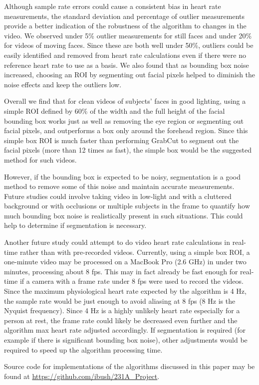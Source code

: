 \documentclass[10pt,twocolumn,letterpaper]{article}
\begin{document}
Although sample rate errors could cause a consistent bias in heart rate measurements, the standard deviation and percentage of outlier measurements provide a better indication of the robustness of the algorithm to changes in the video. We observed under 5\% outlier measurements for still faces and under 20\% for videos of moving faces. Since these are both well under 50\%, outliers could be easily identified and removed from heart rate calculations even if there were no reference heart rate to use as a basis. We also found that as bounding box noise increased, choosing an ROI by segmenting out facial pixels helped to diminish the noise effects and keep the outliers low.

Overall we find that for clean videos of subjects' faces in good lighting, using a simple ROI defined by 60\% of the width and the full height of the facial bounding box works just as well as removing the eye region or segmenting out facial pixels, and outperforms a box only around the forehead region. Since this simple box ROI is much faster than performing GrabCut to segment out the facial pixels (more than 12 times as fast), the simple box would be the suggested method for such videos.

However, if the bounding box is expected to be noisy, segmentation is a good method to remove some of this noise and maintain accurate measurements. Future studies could involve taking video in low-light and with a cluttered background or with occlusions or multiple subjects in the frame to quantify how much bounding box noise is realistically present in such situations. This could help to determine if segmentation is necessary.

Another future study could attempt to do video heart rate calculations in real-time rather than with pre-recorded videos. Currently, using a simple box ROI, a one-minute video may be processed on a MacBook Pro (2.6 GHz) in under two minutes, processing about 8 fps. This may in fact already be fast enough for real-time if a camera with a frame rate under 8 fps were used to record the videos. Since the maximum physiological heart rate expected by the algorithm is 4 Hz, the sample rate would be just enough to avoid aliasing at 8 fps (8 Hz is the Nyquist frequency). Since 4 Hz is a highly unlikely heart rate especially for a person at rest, the frame rate could likely be decreased even further and the algorithm max heart rate adjusted accordingly. If segmentation is required (for example if there is significant bounding box noise), other adjustments would be required to speed up the algorithm processing time.

Source code for implementations of the algorithms discussed in this paper may be found at \url{https://github.com/ibush/231A_Project}.

\newpage

{\small


}
\end{document}
